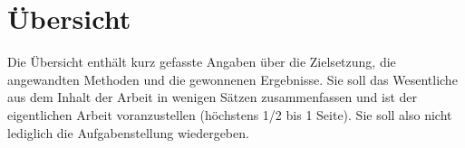 \chapter*{Übersicht}

Die Übersicht enthält kurz gefasste Angaben über die Zielsetzung, die angewandten Methoden und die gewonnenen Ergebnisse. Sie soll das Wesentliche aus dem 
Inhalt der Arbeit in wenigen Sätzen zusammenfassen und ist der eigentlichen Arbeit voranzustellen (höchstens 1/2 bis 1 Seite). Sie soll also nicht lediglich 
die Aufgabenstellung wiedergeben.
